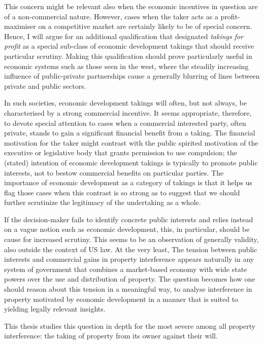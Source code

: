 {This concern might be relevant also when the economic incentives in question are of a non-commercial nature. However, cases when the taker acts as a profit-maximiser on a competitive market are certainly likely to be of special concern. Hence, I will argue for an additional qualification that designated {\it takings for profit} as a special sub-class of economic development takings that should receive particular scrutiny. Making this qualification should prove particularly useful in economic systems such as those seen in the west, where the steadily increasing influence of public-private partnerships cause a generally blurring of lines between private and public sectors.

In such societies, economic development takings will often, but not always, be characterised by a strong commercial incentive. It seems appropriate, therefore, to devote special attention to cases when a commercial interested party, often private, stands to gain a significant financial benefit from a taking. The financial motivation for the taker might contrast with the public spirited motivation of the executive or legislative body that grants permission to use compulsion; the (stated) intention of economic development takings is typically to promote public interests, not to bestow commercial benefits on particular parties. The importance of economic development as a category of takings is that it helps us flag those cases when this contrast is so strong as to suggest that we should further scrutinize the legitimacy of the undertaking as a whole.

If the decision-maker fails to identify concrete public interests and relies instead on a vague notion such as economic development, this, in particular, should be cause for increased scrutiny. This seems to be an observation of generally validity, also outside the context of US law. At the very least, The tension between public interests and commercial gains in property interference appears naturally in any system of government that combines a market-based economy with wide state powers over the use and distribution of property. The question becomes how one should reason about this tension in a meaningful way, to analyse interference in property motivated by economic development in a manner that is suited to yielding legally relevant insights.

This thesis studies this question in depth for the most severe among all property interference: the taking of property from its owner against their will.}

